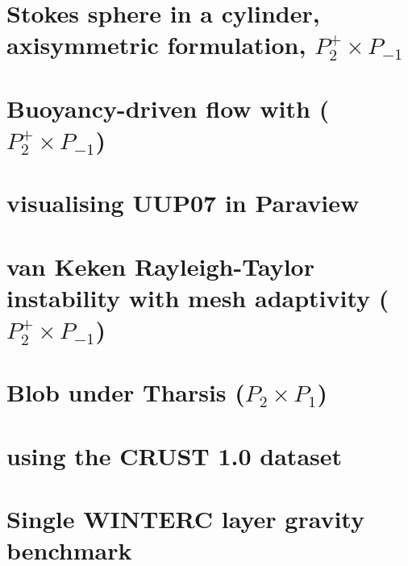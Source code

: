 \documentclass[a4paper,11pt]{report}
\begin{document}
\chapter{Stokes sphere in a cylinder, axisymmetric formulation, $P_2^+\times P_{-1}$ \label{f92}} %

\chapter{Buoyancy-driven flow with ($P_2^+\times P_{-1}$) \label{f93}} %

\chapter{visualising UUP07 in Paraview \label{f94}} %

\chapter{van Keken \etal Rayleigh-Taylor instability with mesh adaptivity ($P_2^+\times P_{-1}$) \label{f95}}

\chapter{Blob under Tharsis ($P_2\times P_1$) \label{f96}} %

\chapter{using the CRUST 1.0 dataset \label{f97}} %

\chapter{Single WINTERC layer gravity benchmark \label{f98}} %
\end{document}
